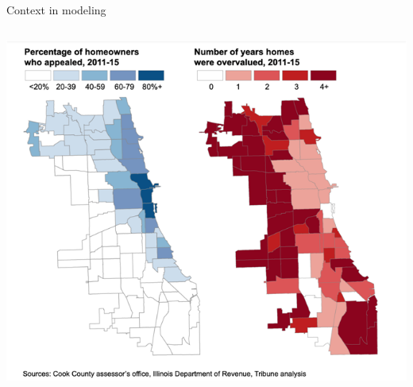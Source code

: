 \documentclass[aspectratio=169]{../latex_main/tntbeamer}  %
\begin{document}
\begin{frame}{Context in modeling}
\begin{columns}
	            
	            \begin{column}{.4\textwidth}
	                      \begin{center}
	                          \includegraphics[scale=.55]{Bild7}
	                      \end{center} 
	            \end{column}
	       \end{columns}
	\end{frame}
	
	
	
\end{document}
